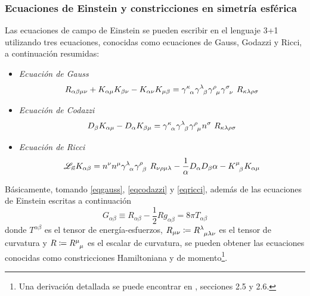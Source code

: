 \documentclass[11pt,twoside,openright,spanish]{report}
\numberwithin{equation}{chapter}
\numberwithin{figure}{chapter}
\numberwithin{table}{chapter}
\begin{document}
\subsubsection{Ecuaciones de Einstein y constricciones en simetría esférica}
\noindent
Las ecuaciones de campo de Einstein se pueden escribir en el lenguaje 3+1 utilizando tres ecuaciones, conocidas como ecuaciones de Gauss, Godazzi y Ricci, a continuación resumidas:

\begin{itemize}
	\item \textit{Ecuación de Gauss}
	\begin{equation}
	R_{\alpha\beta\mu\nu}+K_{\alpha\mu}K_{\beta\nu}-K_{\alpha\nu}K_{\mu\beta}=\tensor{\gamma}{^\kappa_\alpha}\tensor{\gamma}{^\lambda_\beta}\tensor{\gamma}{^\rho_\mu}\tensor{\gamma}{^\sigma_\nu}\ R_{\kappa\lambda\rho\sigma}
	\label{eqgauss}
	\end{equation}
	\item \textit{Ecuación de Codazzi}
	\begin{equation}
	D_\beta K_{\alpha\mu}-D_\alpha K_{\beta\mu}=\tensor{\gamma}{^\kappa_\alpha}\tensor{\gamma}{^\lambda_\beta}\tensor{\gamma}{^\rho_\mu}n^\sigma\ R_{\kappa\lambda\rho\sigma}
	\label{eqcodazzi}
	\end{equation}
	\item \textit{Ecuación de Ricci}
	\begin{equation}
	\mathcal{L}_{\vec{n}}K_{\alpha\beta}=n^\nu n^\mu \tensor{\gamma}{^\lambda_\alpha}\tensor{\gamma}{^\rho_\beta}\ R_{\nu\rho\mu\lambda}-\frac{1}{\alpha}D_{\alpha}D_\beta\alpha-\tensor{K}{^\mu_\beta}K_{\alpha\mu}
	\label{eqricci}
	\end{equation}
\end{itemize}

Básicamente, tomando \eqref{eqgauss}, \eqref{eqcodazzi} y \eqref{eqricci}, además de las ecuaciones de Einstein escritas a continuación
\begin{equation}
G_{\alpha\beta}\equiv R_{\alpha\beta}-\frac{1}{2}Rg_{\alpha\beta}=8\pi T_{\alpha\beta}
\end{equation}
donde $T^{\alpha\beta}$ es el tensor de energía-esfuerzos, $R_{\mu\nu}\coloneqq\tensor{R}{^\lambda_\mu_\lambda_\nu}$ es el tensor de curvatura y $R\coloneqq \tensor{R}{^\mu_\mu}$ es el escalar de curvatura, se pueden obtener las ecuaciones conocidas como constricciones Hamiltoniana y de momento\footnote{Una derivación detallada se puede encontrar en \citet{Shapiro2010}, secciones 2.5 y 2.6.}.
\end{document}
